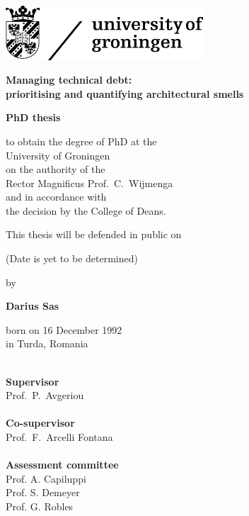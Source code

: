 \pagestyle{empty}
\thispagestyle{empty}
\large
\vspace*{-3cm}

\hspace*{-0.5cm}\includegraphics[width=7.38cm]{Figures/rugr_logoen_zwart_rgb.jpg}

\begin{center}

\vspace{1cm}

{\fontsize{25pt}{30pt}\selectfont \textbf{Managing technical debt:}\\\textbf{prioritising and quantifying architectural smells}}


\vspace{2.5cm}

\textbf{\Large{PhD thesis}}

\vspace{1.6cm}

to obtain the degree of PhD at the\\
University of Groningen\\
on the authority of the\\
Rector Magnificus Prof.\ C.~Wijmenga\\
and in accordance with\\
the decision by the College of Deans.

\vspace{0.4cm}

This thesis will be defended in public on

\vspace{0.4cm}

(Date is yet to be determined)

\vspace{1cm}

by

\vspace{1cm}

\textbf{\Large{Darius Sas}}\\

\vspace{0.4cm}

born on 16 December 1992\\
in Turda, Romania
\end{center}
\enlargethispage{\baselineskip}

\restoregeometry
\clearpage
\thispagestyle{empty}
\noindent
\\
\textbf{Supervisor}\\
Prof.\ P.\ Avgeriou\\

\noindent
\\
\textbf{Co-supervisor}\\
Prof.\ F.\ Arcelli Fontana\\

\noindent
\\
\textbf{Assessment committee}\\
Prof. A. Capiluppi\\
Prof. S. Demeyer\\
Prof. G. Robles\\

\vfill
\normalsize
